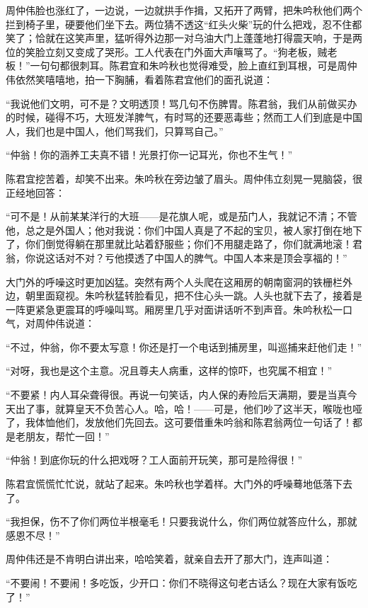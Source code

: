 \par 周仲伟脸也涨红了，一边说，一边就拱手作揖，又拓开了两臂，把朱吟秋他们两个拦到椅子里，硬要他们坐下去。两位猜不透这“红头火柴”玩的什么把戏，忍不住都笑了；恰就在这笑声里，猛听得外边那一对乌油大门上蓬蓬地打得震天响，于是两位的笑脸立刻又变成了哭形。工人代表在门外面大声嚷骂了。“狗老板，贼老板！”一句句都很刺耳。陈君宜和朱吟秋也觉得难受，脸上直红到耳根，可是周仲伟依然笑嘻嘻地，拍一下胸脯，看着陈君宜他们的面孔说道：
\par “我说他们文明，可不是？文明透顶！骂几句不伤脾胃。陈君翁，我们从前做买办的时候，碰得不巧，大班发洋脾气，有时骂的还要恶毒些；然而工人们到底是中国人，我们也是中国人，他们骂我们，只算骂自己。”
\par “仲翁！你的涵养工夫真不错！光景打你一记耳光，你也不生气！”
\par 陈君宜挖苦着，却笑不出来。朱吟秋在旁边皱了眉头。周仲伟立刻晃一晃脑袋，很正经地回答：
\par “可不是！从前某某洋行的大班——是花旗人呢，或是茄门人，我就记不清；不管他，总之是外国人；他对我说：你们中国人真是了不起的宝贝，被人家打倒在地下了，你们倒觉得躺在那里就比站着舒服些；你们不用腿走路了，你们就满地滚！君翁，你说这话对不对？亏他摸透了中国人的脾气。中国人本来是顶会享福的！”
\par 大门外的呼噪这时更加凶猛。突然有两个人头爬在这厢房的朝南窗洞的铁栅栏外边，朝里面窥视。朱吟秋猛转脸看见，把不住心头一跳。人头也就下去了，接着是一阵更紧急更震耳的呼噪叫骂。厢房里几乎对面讲话听不到声音。朱吟秋松一口气，对周仲伟说道：
\par “不过，仲翁，你不要太写意！你还是打一个电话到捕房里，叫巡捕来赶他们走！”
\par “对呀，我也是这个主意。况且尊夫人病重，这样的惊吓，也究属不相宜！”
\par “不要紧！内人耳朵聋得很。再说一句笑话，内人保的寿险后天满期，要是当真今天出了事，就算皇天不负苦心人。哈，哈！——可是，他们吵了这半天，喉咙也哑了，我体恤他们，发放他们先回去。这可要借重朱吟翁和陈君翁两位一句话了！都是老朋友，帮忙一回！”
\par “仲翁！到底你玩的什么把戏呀？工人面前开玩笑，那可是险得很！”
\par 陈君宜慌慌忙忙说，就站了起来。朱吟秋也学着样。大门外的呼噪蓦地低落下去了。
\par “我担保，伤不了你们两位半根毫毛！只要我说什么，你们两位就答应什么，那就感恩不尽！”
\par 周仲伟还是不肯明白讲出来，哈哈笑着，就亲自去开了那大门，连声叫道：
\par “不要闹！不要闹！多吃饭，少开口：你们不晓得这句老古话么？现在大家有饭吃了！”
